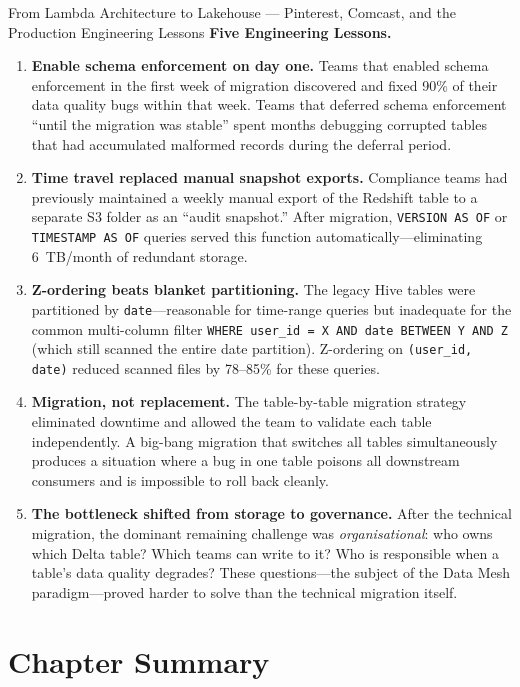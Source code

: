 \begin{casestudy}{From Lambda Architecture to Lakehouse ---
  Pinterest, Comcast, and the Production Engineering Lessons}
\textbf{Five Engineering Lessons.}
\begin{enumerate}
  \item \textbf{Enable schema enforcement on day one.}
        Teams that enabled schema enforcement in the first week of migration
        discovered and fixed 90\% of their data quality bugs within that
        week. Teams that deferred schema enforcement ``until the migration
        was stable'' spent months debugging corrupted tables that had
        accumulated malformed records during the deferral period.
  \item \textbf{Time travel replaced manual snapshot exports.}
        Compliance teams had previously maintained a weekly manual export
        of the Redshift table to a separate S3 folder as an ``audit snapshot.''
        After migration, \texttt{VERSION AS OF} or \texttt{TIMESTAMP AS OF}
        queries served this function automatically---eliminating 6~TB/month
        of redundant storage.
  \item \textbf{Z-ordering beats blanket partitioning.}
        The legacy Hive tables were partitioned by \texttt{date}---reasonable
        for time-range queries but inadequate for the common multi-column
        filter \texttt{WHERE user\_id = X AND date BETWEEN Y AND Z}
        (which still scanned the entire date partition). Z-ordering on
        \texttt{(user\_id, date)} reduced scanned files by 78--85\% for
        these queries.
  \item \textbf{Migration, not replacement.}
        The table-by-table migration strategy eliminated downtime and allowed
        the team to validate each table independently. A big-bang migration
        that switches all tables simultaneously produces a situation where
        a bug in one table poisons all downstream consumers and is impossible
        to roll back cleanly.
  \item \textbf{The bottleneck shifted from storage to governance.}
        After the technical migration, the dominant remaining challenge was
        \emph{organisational}: who owns which Delta table? Which teams can
        write to it? Who is responsible when a table's data quality degrades?
        These questions---the subject of the Data Mesh paradigm---proved
        harder to solve than the technical migration itself.
\end{enumerate}
\end{casestudy}

\section*{Chapter Summary}
\label{sec:ch11-summary}


